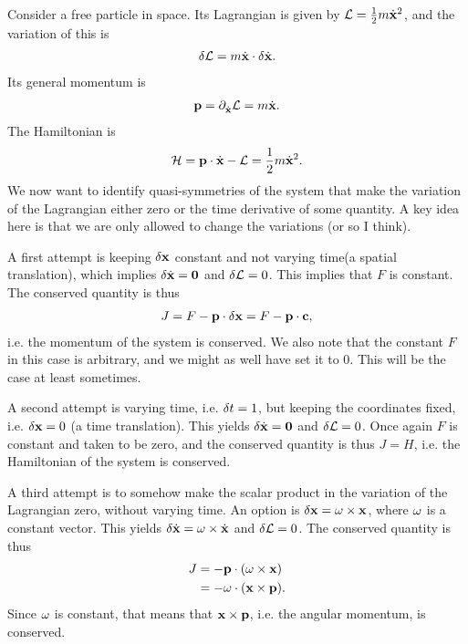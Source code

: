Consider a free particle in space. Its Lagrangian is given by $\mathcal{L} = \frac{1}{2}m\dot{\vb{x}}^{2}$, and the variation of this is
\begin{align*}
	\delta \mathcal{L} = m\dot{\vb{x}}\cdot\delta \dot{\vb{x}}.
\end{align*}
Its general momentum is
\begin{align*}
	\vb{p} = \partial^{}_{\dot{\vb{x}}}\mathcal{L} = m\dot{\vb{x}}.
\end{align*}
The Hamiltonian is
\begin{align*}
	\mathcal{H} = \vb{p}\cdot\dot{\vb{x}} - \mathcal{L} = \frac{1}{2}m\dot{\vb{x}}^{2}.
\end{align*}
We now want to identify quasi-symmetries of the system that make the variation of the Lagrangian either zero or the time derivative of some quantity. A key idea here is that we are only allowed to change the variations (or so I think).

A first attempt is keeping $\delta \vb{x}$ constant and not varying time(a spatial translation), which implies $\delta \dot{\vb{x}} = \vb{0}$ and $\delta \mathcal{L} = 0$. This implies that $F$ is constant. The conserved quantity is thus
\begin{align*}
	J = F - \vb{p}\cdot\delta \vb{x} = F - \vb{p}\cdot\vb{c},
\end{align*}
i.e. the momentum of the system is conserved. We also note that the constant $F$ in this case is arbitrary, and we might as well have set it to $0$. This will be the case at least sometimes.

A second attempt is varying time, i.e. $\delta t = 1$, but keeping the coordinates fixed, i.e. $\delta \vb{x} = 0$ (a time translation). This yields $\delta \dot{\vb{x}} = \vb{0}$ and $\delta \mathcal{L} = 0$. Once again $F$ is constant and taken to be zero, and the conserved quantity is thus $J = H$, i.e. the Hamiltonian of the system is conserved.

A third attempt is to somehow make the scalar product in the variation of the Lagrangian zero, without varying time. An option is $\delta \vb{x} = \vb{\omega}\times\vb{x}$, where $\vb{\omega}$ is a constant vector. This yields $\delta \dot{\vb{x}} = \vb{\omega}\times\dot{\vb{x}}$ and $\delta \mathcal{L} = 0$. The conserved quantity is thus
\begin{align*}
	J &= -\vb{p}\cdot(\vb{\omega}\times\vb{x}) \\
	  &= -\vb{\omega}\cdot(\vb{x}\times\vb{p}).
\end{align*}
Since $\vb{\omega}$ is constant, that means that $\vb{x}\times\vb{p}$, i.e. the angular momentum, is conserved.

